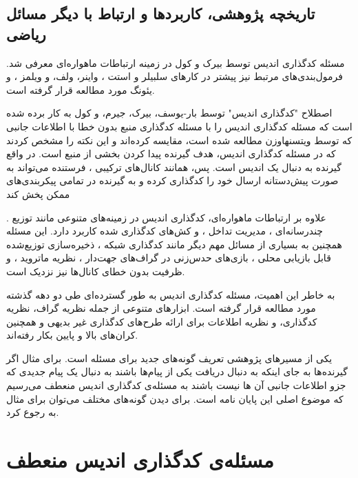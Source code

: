 \subsection{
	تاریخچه پژوهشی، کاربردها و ارتباط با دیگر مسائل ریاضی
	}
مسئله کدگذاری اندیس توسط بیرک و کول 
\cite{25, 26}
 در زمینه ارتباطات ماهواره‌ای معرفی شد. فرمول‌بندی‌های مرتبط نیز پیشتر در کارهای سلبیلر و استت
  \cite{paper:1455117:Celebiler}،
   واینر، ولف، و ویلمز 
\cite{152}
، و یئونگ 
\cite{158}
 مورد مطالعه قرار گرفته است.
 
 \noindent
  اصطلاح "کدگذاری اندیس" توسط بار-یوسف، بیرک، جیرم، و کول 
\cite{4031356}
 به کار برده شده است که مسئله کدگذاری اندیس را با مسئله کدگذاری منبع بدون خطا با اطلاعات جانبی که توسط ویتسنهاوزن
\cite{1055607}
 مطالعه شده است، مقایسه کرده‌اند و این نکته را مشخص کردند که در مسئله کدگذاری اندیس، هدف گیرنده پیدا کردن بخشی از منبع است. در واقع گیرنده به دنبال یک اندیس است. پس، همانند کانال‌های ترکیبی
 \cite{27, 53, 154}
، فرستنده می‌تواند به صورت پیش‌دستانه ارسال خود را کدگذاری کرده و به گیرنده در تمامی پیکربندی‌های ممکن پخش کند
\cite{48}

. علاوه بر ارتباطات ماهواره‌ای، کدگذاری اندیس در زمینه‌های متنوعی مانند توزیع چندرسانه‌ای 
\cite{114}
، مدیریت تداخل 
\cite{81}
، و  کش‌های کدگذاری شده 
\cite{103, 82}
 کاربرد دارد. این مسئله همچنین به بسیاری از مسائل مهم دیگر مانند کدگذاری شبکه 
\cite{122, 61, 59}
، ذخیره‌سازی توزیع‌شده قابل بازیابی محلی 
\cite{108, 128, 13}
، بازی‌های حدس‌زنی در گراف‌های جهت‌دار 
\cite{122, 162, 13}
، نظریه ماتروید 
\cite{61}
، و ظرفیت بدون خطای کانال‌ها 
\cite{131}
 نیز نزدیک است.
 
به خاطر این اهمیت، مسئله کدگذاری اندیس به طور گسترده‌ای طی دو دهه گذشته مورد مطالعه قرار گرفته است. ابزارهای متنوعی از جمله نظریه گراف، نظریه کدگذاری، و نظریه اطلاعات برای ارائه طرح‌های کدگذاری غیر بدیهی
\cite{25, 101, 22, 43, 114, 29, 8, 104, 81, 130, 7, 9, 149, 116, 80, 141, 146, 162}
و همچنین کران‌‌های بالا و پایین 
\cite{160, 22, 55, 28, 17, 141}
 بکار رفته‌اند.
 
 یکی از مسیرهای پژوهشی تعریف گونه‌های جدید برای مسئله است. برای مثال اگر گیرنده‌ها به جای اینکه به دنبال دریافت یکی از پیام‌ها باشند  به دنبال یک پیام جدیدی که جزو اطلاعات جانبی آن ها نیست باشند به مسئله‌ی کدگذاری اندیس منعطف می‌رسیم که موضوع اصلی این پایان نامه است. برای  دیدن گونه‌های مختلف می‌توان برای مثال به
 \cite{pliablefirstpaper, verypliable, byrne2023preferential}
 رجوع کرد.
 \pagebreak
 \section{
 مسئله‌ی کدگذاری اندیس منعطف
 }
